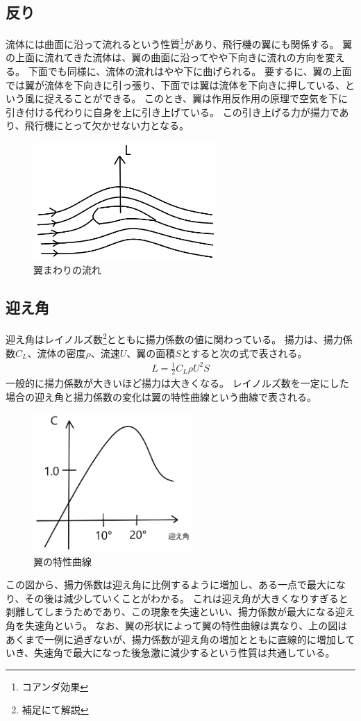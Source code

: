 \documentclass[10pt,b5paper,papersize,dvipdfmx]{jsbook}
\begin{document}
\subsection{反り}
流体には曲面に沿って流れるという性質\footnote{コアンダ効果}があり、飛行機の翼にも関係する。
翼の上面に流れてきた流体は、翼の曲面に沿ってやや下向きに流れの方向を変える。
下面でも同様に、流体の流れはやや下に曲げられる。
要するに、翼の上面では翼が流体を下向きに引っ張り、下面では翼は流体を下向きに押している、という風に捉えることができる。
このとき、翼は作用反作用の原理で空気を下に引き付ける代わりに自身を上に引き上げている。
この引き上げる力が揚力であり、飛行機にとって欠かせない力となる。
\vspace{2zw} %
\begin{figure}[ht]
  \centering
  \includegraphics[width=70mm]{img/ryuutai7.png}
  \caption{翼まわりの流れ}
  \label{fig:7}
\end{figure}

\subsection{迎え角}
迎え角はレイノルズ数\footnote{補足にて解説}とともに揚力係数の値に関わっている。
揚力は、揚力係数$C_L$、流体の密度$\rho $、流速$U$、翼の面積$S$とすると次の式で表される。
\begin{align}
  L = \frac{1}{2}C_L\rho U^2S
\end{align}
一般的に揚力係数が大きいほど揚力は大きくなる。
レイノルズ数を一定にした場合の迎え角と揚力係数の変化は翼の特性曲線という曲線で表される。
\par
\begin{figure}[ht]
  \centering
  \includegraphics[width=60mm]{img/ryuutai8.png}
  \caption{翼の特性曲線}
\end{figure}
この図から、揚力係数は迎え角に比例するように増加し、ある一点で最大になり、その後は減少していくことがわかる。
これは迎え角が大きくなりすぎると剥離してしまうためであり、この現象を失速といい、揚力係数が最大になる迎え角を失速角という。
なお、翼の形状によって翼の特性曲線は異なり、上の図はあくまで一例に過ぎないが、揚力係数が迎え角の増加とともに直線的に増加していき、失速角で最大になった後急激に減少するという性質は共通している。
\end{document}
